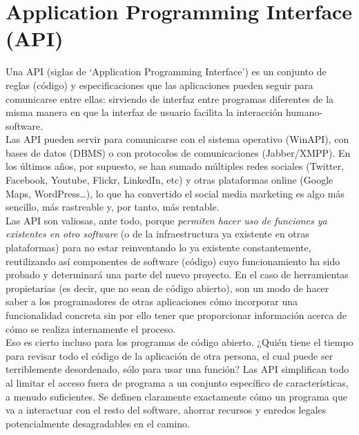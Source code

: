 \section{Application Programming Interface (API)}
Una API (siglas de ‘Application Programming Interface’) es un conjunto de reglas (código) y especificaciones que las aplicaciones pueden seguir para comunicarse entre ellas: sirviendo de interfaz entre programas diferentes de la misma manera en que la interfaz de usuario facilita la interacción humano-software.\\

Las API pueden servir para comunicarse con el sistema operativo (WinAPI), con bases de datos (DBMS) o con protocolos de comunicaciones (Jabber/XMPP). En los últimos años, por supuesto, se han sumado múltiples redes sociales (Twitter, Facebook, Youtube, Flickr, LinkedIn, etc) y otras plataformas online (Google Maps, WordPress…), lo que ha convertido el social media marketing es algo más sencillo, más rastreable y, por tanto, más rentable.\\
\newpage
Las API son valiosas, ante todo, porque \emph{permiten hacer uso de funciones ya existentes en otro software} (o de la infraestructura ya existente en otras plataformas) para no estar reinventando lo ya existente constantemente, reutilizando así componentes de software (código) cuyo funcionamiento ha sido probado y determinará una parte del nuevo proyecto. En el caso de herramientas propietarias (es decir, que no sean de código abierto), son un modo de hacer saber a los programadores de otras aplicaciones cómo incorporar una funcionalidad concreta sin por ello tener que proporcionar información acerca de cómo se realiza internamente el proceso. \cite{3}\\

Eso es cierto incluso para los programas de código abierto. ¿Quién tiene el tiempo para revisar todo el código de la aplicación de otra persona, el cual puede ser terriblemente desordenado, sólo para usar una función? Las API simplifican todo al limitar el acceso fuera de programa a un conjunto específico de características, a menudo suficientes. Se definen claramente exactamente cómo un programa que va a interactuar con el resto del software, ahorrar recursos y enredos legales potencialmente desagradables en el camino. \cite{16}
